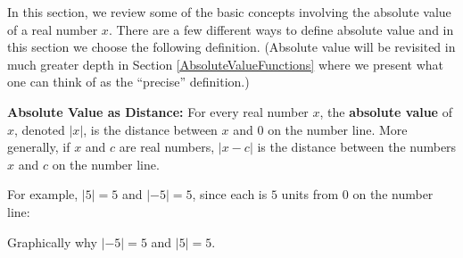 \documentclass{ximera}
\begin{document}
	\author{Stitz-Zeager}




\setcounter{footnote}{0}

\label{AppAbsValEqIneq}

In this section, we review some of the basic concepts involving the absolute value of a real number $x$.  There are a few different ways to define absolute value and in this section we choose the following definition.  (Absolute value will be revisited in much greater depth in Section \ref{AbsoluteValueFunctions} where we present what one can think of as the ``precise'' definition.)

 


\begin{definition}\label{absvaldistdefn}{\bf Absolute Value as Distance:}  For every real number $x$, the \textbf{absolute value} of $x$, denoted $|x|$, is the distance between $x$ and $0$ on the number line.  More generally, if $x$ and $c$ are real numbers, $|x-c|$ is the distance between the numbers $x$ and $c$ on the number line.

\end{definition}


For example, $|5| = 5$ and $|-5| = 5$, since each is $5$ units from $0$ on the number line:

\begin{center}

Graphically why $|-5|=5$ and $|5|=5$.

\end{center}
\end{document}
